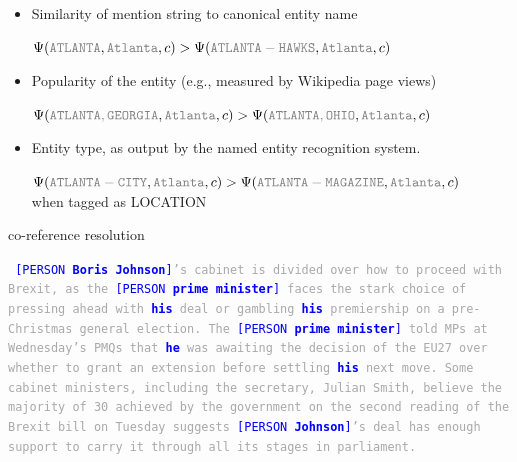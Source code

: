 \documentclass[landscape]{jhuslides3C}
\newcommand{\maths}[1]{\textcolor{purple}{#1}}
\begin{document}

\vfill
\begin{itemize}
\item Similarity of  mention string to  canonical entity name

\maths{$\Psi(\textcolor{darkgrey}{\tt ATLANTA}, \textcolor{darkgrey}{\tt Atlanta}, c) > 
\Psi(\textcolor{darkgrey}{\tt ATLANTA-HAWKS}, \textcolor{darkgrey}{\tt Atlanta}, c)$}

\item Popularity of the entity (e.g., measured by Wikipedia page views) 

\maths{$\Psi(\textcolor{darkgrey}{\tt ATLANTA, GEORGIA}, \textcolor{darkgrey}{\tt Atlanta}, c) > 
\Psi(\textcolor{darkgrey}{\tt ATLANTA, OHIO}, \textcolor{darkgrey}{\tt Atlanta}, c)$}

\item Entity type, as output by the named entity recognition system.

\maths{$\Psi(\textcolor{darkgrey}{\tt ATLANTA-CITY}, \textcolor{darkgrey}{\tt Atlanta}, c) > 
\Psi(\textcolor{darkgrey}{\tt ATLANTA-MAGAZINE}, \textcolor{darkgrey}{\tt Atlanta}, c)$}\\
 when tagged as LOCATION
\end{itemize}
\vfill


\slide{}
\vspace{85mm}
\begin{center}
{\huge co-reference resolution}
\end{center}


\vfill
\textcolor{darkgrey}{\begin{flushleft} \tt
\newcommand{\person}[1]{\textcolor{blue}{{\small [PERSON} #1{\small ]}}}
\newcommand{\pronoun}[1]{\textcolor{blue}{\textbf{#1}}}
\newcommand{\gpe}[1]{#1}
\newcommand{\nedate}[1]{#1}
\newcommand{\event}[1]{#1}
\newcommand{\nenumber}[1]{#1}
\person{\textbf{Boris Johnson}}'s \gpe{cabinet} is divided over how to proceed with \event{Brexit}, as the \person{\textbf{prime minister}} faces the stark choice of pressing ahead with \pronoun{his} deal or gambling \pronoun{his} premiership on a \nedate{pre-Christmas} general election. The \person{\textbf{prime minister}} told MPs at \nedate{Wednesday}'s \event{PMQs} that \pronoun{he} was awaiting the decision of the \gpe{EU27} over whether to grant an extension before settling \pronoun{his} next move. Some cabinet ministers, including the secretary, Julian Smith, believe the majority of \nenumber{30} achieved by the \gpe{government} on the second reading of the \event{Brexit} bill on \nedate{Tuesday} suggests \person{\textbf{Johnson}}'s deal has enough support to carry it through all its stages in \gpe{parliament}.
\end{flushleft}}
\vfill
\end{document}
